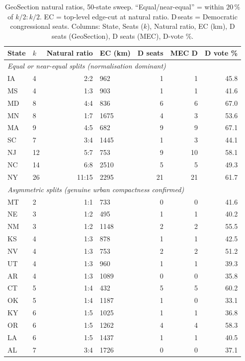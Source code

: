 \begin{table}[h]
\centering
\caption{GeoSection natural ratios, 50-state sweep.
  ``Equal/near-equal'' = within $20\,\%$ of $k/2:k/2$.
  EC = top-level edge-cut at natural ratio. D\,seats = Democratic congressional seats.
  Columns: State, Seats ($k$), Natural ratio, EC (km), D seats (GeoSection), D seats (MEC), D-vote \%.}
\label{tab:natural-ratios}
\small
\begin{tabular}{llrlrrr}
\toprule
State & $k$ & Natural ratio & EC (km) & D seats & MEC D & D vote \% \\
\midrule
\multicolumn{7}{l}{\textit{Equal or near-equal splits (normalisation dominant)}} \\
IA  &  4 & 2:2 &  962 & 1 & 1 & 45.8 \\
MS  &  4 & 1:3 &  903 & 1 & 1 & 41.6 \\
MD  &  8 & 4:4 &  836 & 6 & 6 & 67.0 \\
MN  &  8 & 1:7 & 1675 & 4 & 3 & 53.6 \\
MA  &  9 & 4:5 &  682 & 9 & 9 & 67.1 \\
SC  &  7 & 3:4 & 1445 & 1 & 3 & 44.1 \\
NJ  & 12 & 5:7 &  753 & 9 & 10 & 58.1 \\
NC  & 14 & 6:8 & 2510 & 5 & 5 & 49.3 \\
NY  & 26 & 11:15 & 2295 & 21 & 21 & 61.7 \\
\midrule
\multicolumn{7}{l}{\textit{Asymmetric splits (genuine urban compactness confirmed)}} \\
MT  &  2 & 1:1 &  733 & 0 & 0 & 41.6 \\
NE  &  3 & 1:2 &  495 & 1 & 1 & 40.2 \\
NM  &  3 & 1:2 & 1148 & 2 & 2 & 55.5 \\
KS  &  4 & 1:3 &  878 & 1 & 1 & 42.5 \\
NV  &  4 & 1:3 &  753 & 2 & 2 & 51.2 \\
UT  &  4 & 1:3 &  960 & 1 & 1 & 39.3 \\
AR  &  4 & 1:3 & 1089 & 0 & 0 & 35.8 \\
CT  &  5 & 1:4 &  432 & 5 & 5 & 60.2 \\
OK  &  5 & 1:4 & 1187 & 1 & 0 & 33.1 \\
KY  &  6 & 1:5 & 1025 & 1 & 1 & 36.8 \\
OR  &  6 & 1:5 & 1262 & 4 & 4 & 58.3 \\
LA  &  6 & 1:5 & 1437 & 1 & 1 & 40.5 \\
AL  &  7 & 3:4 & 1726 & 0 & 0 & 37.1 \\

\end{tabular}
\end{table}
